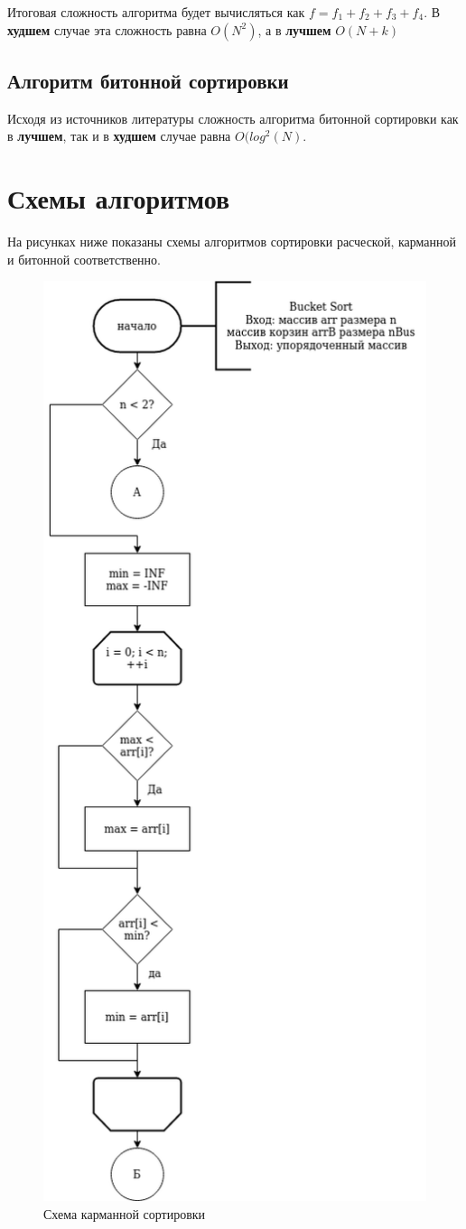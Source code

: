 \documentclass[12pt]{report}
\begin{document}
	Итоговая сложность алгоритма будет вычисляться как $f = f_{1} + f_{2} + f_{3} + f_{4}$. В \textbf{худшем} случае эта сложность равна $O(N^2)$, а в \textbf{лучшем} $O(N + k)$
	
	\subsection{Алгоритм битонной сортировки}
	
	Исходя из источников литературы сложность алгоритма битонной сортировки как в \textbf{лучшем}, так и в \textbf{худшем} случае равна $O(log^{2}(N)$.
	
	\section{Схемы алгоритмов}
	
	
	На рисунках ниже показаны схемы алгоритмов сортировки расческой, карманной и битонной соответственно.
	
	\begin{figure}[h]
		\centering
		\includegraphics[width=0.5\linewidth]{bucket_1}
		\caption{Схема карманной сортировки}
		\label{fig:schema_bucket_1}
	\end{figure}
	
\end{document}
